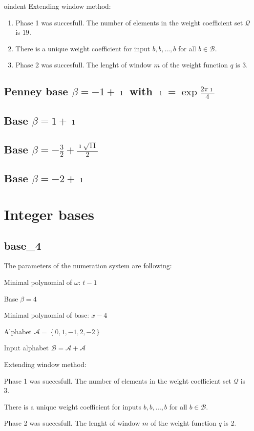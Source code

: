 oindent Extending window method:
\begin{enumerate}
    \item Phase 1 was succesfull.
The number of elements in the weight coefficient set $\mathcal{Q}$ is $19$.

    \item There is a unique weight coefficient for input $b,b,\dots,b$ for all $b\in\mathcal{B}$.

    \item Phase 2 was succesfull.
The lenght of window $m$ of the weight function $q$ is 3.
\end{enumerate}



\subsection{Penney base $\beta = -1 + \imath$ with $\imath = \exp{\frac{2 \pi \imath}{4}}$}


\subsection{Base $\beta = 1 + \imath$}


\subsection{Base $\beta = -\frac{3}{2} + \frac{\imath \sqrt{11}}{2}$}


\subsection{Base $\beta = -2 + \imath$}

\section{Integer bases}
\subsection{ base\_4 }

\label{subsec: base4 }

The parameters of the numeration system are following:

Minimal polynomial of $\omega$: $ t - 1 $

Base $\beta= 4 $

Minimal polynomial of base: $ x - 4 $

Alphabet $\mathcal{A} =\left\{0, 1, -1, 2, -2\right\}$

Input alphabet $\mathcal{B} =\mathcal{A}+ \mathcal{A}$

Extending window method:

Phase 1 was succesfull.
The number of elements in the weight coefficient set $\mathcal{Q}$ is $3$.

There is a unique weight coefficient for inputs $b,b,\dots,b$ for all $b\in\mathcal{B}$.

Phase 2 was succesfull.
The lenght of window $m$ of the weight function $q$ is 2.
